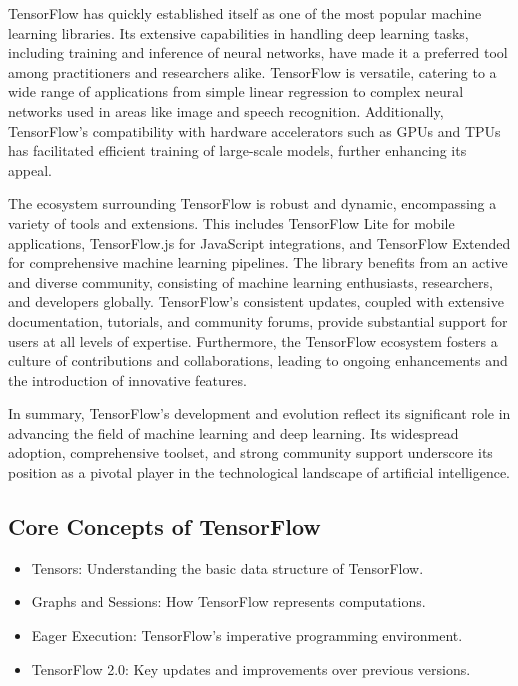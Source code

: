 \documentclass[a4paper,12pt]{book}
\begin{document}
TensorFlow has quickly established itself as one of the most popular machine learning libraries. Its extensive capabilities in handling deep learning tasks, including training and inference of neural networks, have made it a preferred tool among practitioners and researchers alike. TensorFlow is versatile, catering to a wide range of applications from simple linear regression to complex neural networks used in areas like image and speech recognition. Additionally, TensorFlow's compatibility with hardware accelerators such as GPUs and TPUs has facilitated efficient training of large-scale models, further enhancing its appeal.

The ecosystem surrounding TensorFlow is robust and dynamic, encompassing a variety of tools and extensions. This includes TensorFlow Lite for mobile applications, TensorFlow.js for JavaScript integrations, and TensorFlow Extended for comprehensive machine learning pipelines. The library benefits from an active and diverse community, consisting of machine learning enthusiasts, researchers, and developers globally. TensorFlow's consistent updates, coupled with extensive documentation, tutorials, and community forums, provide substantial support for users at all levels of expertise. Furthermore, the TensorFlow ecosystem fosters a culture of contributions and collaborations, leading to ongoing enhancements and the introduction of innovative features.

In summary, TensorFlow's development and evolution reflect its significant role in advancing the field of machine learning and deep learning. Its widespread adoption, comprehensive toolset, and strong community support underscore its position as a pivotal player in the technological landscape of artificial intelligence.







\subsection{Core Concepts of TensorFlow}
\begin{itemize}
    \item Tensors: Understanding the basic data structure of TensorFlow.
    \item Graphs and Sessions: How TensorFlow represents computations.
    \item Eager Execution: TensorFlow's imperative programming environment.
    \item TensorFlow 2.0: Key updates and improvements over previous versions.
\end{itemize}
\end{document}
